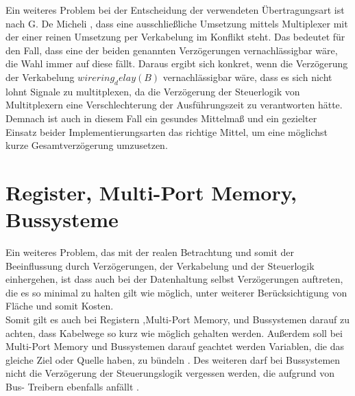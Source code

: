 \documentclass[conference]{IEEEtran}
\begin{document}
 Ein weiteres Problem bei der Entscheidung
der verwendeten Übertragungsart ist nach G. De Micheli
\cite[S.250]{3}, dass eine ausschließliche Umsetzung mittels
Multiplexer mit der einer reinen Umsetzung per Verkabelung
im Konflikt steht. Das bedeutet für den Fall, dass eine der
beiden genannten Verzögerungen vernachlässigbar wäre, die
Wahl immer auf diese fällt. Daraus ergibt sich konkret, wenn
die Verzögerung der Verkabelung $wirering_delay(B)$ vernachlässigbar
wäre, dass es sich nicht lohnt Signale zu multitplexen,
da die Verzögerung der Steuerlogik von Multitplexern
eine Verschlechterung der Ausführungszeit zu verantworten
hätte.\\
Demnach ist auch in diesem Fall ein gesundes Mittelmaß
und ein gezielter Einsatz beider Implementierungsarten das
richtige Mittel, um eine möglichst kurze Gesamtverzögerung
umzusetzen.

\section{Register, Multi-Port Memory, Bussysteme}
Ein weiteres Problem, das mit der realen Betrachtung und somit
der Beeinflussung durch Verzögerungen, der Verkabelung und
der Steuerlogik einhergehen, ist dass auch bei der Datenhaltung
selbst Verzögerungen auftreten, die es so minimal zu
halten gilt wie möglich, unter weiterer Berücksichtigung von
Fläche und somit Kosten.\\
Somit gilt es auch bei Registern ,Multi-Port Memory, und
Bussystemen darauf zu achten, dass Kabelwege so kurz wie
möglich gehalten werden. Außerdem soll bei Multi-Port Memory
und Bussystemen darauf geachtet werden Variablen, die
das gleiche Ziel oder Quelle haben, zu bündeln \cite[S.250]{3}.
Des weiteren darf bei Bussystemen nicht die Verzögerung
der Steuerungslogik vergessen werden, die aufgrund von Bus-
Treibern ebenfalls anfällt \cite[S.250]{3}.
\end{document}
